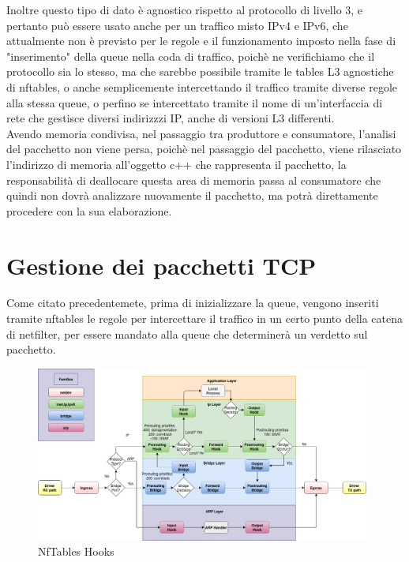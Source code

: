 Inoltre questo tipo di dato è agnostico rispetto al protocollo di livello 3, e pertanto può essere usato anche per un traffico misto IPv4 e IPv6, che attualmente
non è previsto per le regole e il funzionamento imposto nella fase di "inserimento" della queue nella coda di traffico, poichè ne verifichiamo che il protocollo
sia lo stesso, ma che sarebbe possibile tramite le tables L3 agnostiche di nftables, o anche semplicemente intercettando il traffico tramite diverse regole alla stessa queue,
o perfino se intercettato tramite il nome di un'interfaccia di rete che gestisce diversi indirizzzi IP, anche di versioni L3 differenti.\\
Avendo memoria condivisa, nel passaggio tra produttore e consumatore, l'analisi del pacchetto non viene persa, poichè nel passaggio del pacchetto, viene rilasciato l'indirizzo
di memoria all'oggetto c++ che rappresenta il pacchetto, la responsabilità di deallocare questa area di memoria passa al consumatore che quindi non dovrà
analizzare nuovamente il pacchetto, ma potrà direttamente procedere con la sua elaborazione.

\section{Gestione dei pacchetti TCP}

Come citato precedentemete, prima di inizializzare la queue, vengono inseriti tramite nftables le regole per intercettare il traffico in un certo punto della catena
di netfilter, per essere mandato alla queue che determinerà un verdetto sul pacchetto.\\

\begin{figure}[H]
    \centering
    \includegraphics[width=0.98\textwidth]{images/chapter3/nf-hooks.png}
    \caption{NfTables Hooks}
    \label{fig:nftables_hooks}
\end{figure}

